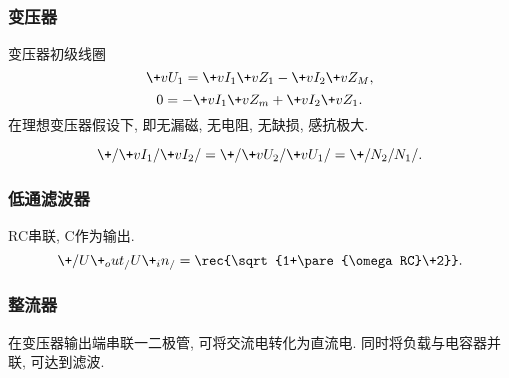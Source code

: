 \documentclass[hidelinks]{ctexart}
\begin{document}

\subsubsection{变压器} %
\label{ssub:变压器}

变压器初级线圈
\[ \+vU_1 = \+vI_1 \+vZ_1 - \+vI_2 \+vZ_M, \]
\[ 0 = -\+vI_1 \+vZ_m + \+vI_2 \+vZ_1. \]
在理想变压器假设下, 即无漏磁, 无电阻, 无缺损, 感抗极大.
\begin{finale}
    \[ \+/\+vI_1/\+vI_2/ = \+/\+vU_2/\+vU_1/ = \+/N_2/N_1/. \]
\end{finale}


\subsubsection{低通滤波器} %
\label{ssub:低通滤波器}

RC串联, C作为输出.
\[ \+/U\+_out_/U\+_in_/ = \rec{\sqrt{1+\pare{\omega RC}\+2}}. \]


\subsubsection{整流器} %
\label{ssub:整流器}

在变压器输出端串联一二极管, 可将交流电转化为直流电. 同时将负载与电容器并联, 可达到滤波.



\end{document}
